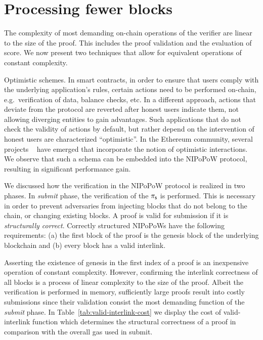 \section{Processing fewer blocks}

The complexity of most demanding on-chain operations of the verifier are linear
to the size of the proof. This includes the proof validation and the evaluation
of score. We now present two techniques that allow for equivalent operations of
constant complexity.

\textsf{Optimistic schemes.} In smart contracts, in order to ensure that users
comply with the underlying application's rules, certain actions need to be
performed on-chain, e.g.\ verification of data, balance checks, etc. In a
different approach, actions that deviate from the protocol are reverted after
honest users indicate them, not allowing diverging entities to gain advantages.
Such applications that do not check the validity of actions by default, but
rather depend on the intervention of honest users are characterized
``optimistic''. In the Ethereum community, several projects ~\cite{piza,
plasma, rollups-1, rollups-2} have emerged that incorporate the notion of
optimistic interactions. We observe that such a schema can be embedded into the
NIPoPoW protocol, resulting in significant performance gain.

We discussed how the verification in the NIPoPoW protocol is realized in two
phases. In \emph{submit} phase, the verification of the $\mathsf{\pi_{s}}$ is performed.
This is necessary in order to prevent adversaries from injecting blocks that do
not belong to the chain, or changing existing blocks. A proof is valid for
submission if it is \emph{structurally correct}. Correctly structured NIPoPoWs
have the following requirements: (a) the first block of the proof is the
genesis block of the underlying blockchain and (b) every block has a valid
interlink.

Asserting the existence of genesis in the first index of a proof is an
inexpensive operation of constant complexity. However, confirming the interlink
correctness of all blocks is a process of linear complexity to the size of the
proof. Albeit the verification is performed in memory, sufficiently large
proofs result into costly submissions since their validation consist the most
demanding function of the \emph{submit} phase. In
Table~\ref{tab:valid-interlink-cost} we display the cost of
\textsf{valid-interlink} function which determines the structural correctness
of a proof in comparison with the overall gas used in \textsf{submit}.

